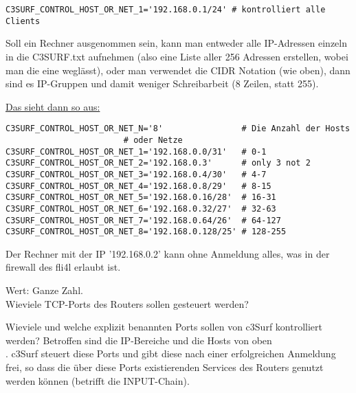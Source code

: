 \begin{itemize}
\begin{description}
\begin{example}
\begin{verbatim}
C3SURF_CONTROL_HOST_OR_NET_1='192.168.0.1/24' # kontrolliert alle Clients
\end{verbatim}
\end{example}

Soll ein Rechner ausgenommen sein, kann man entweder alle IP-Adressen
einzeln in die C3SURF.txt aufnehmen (also eine Liste aller 256 Adressen
erstellen, wobei man die eine weglässt), oder man verwendet die CIDR Notation
(wie oben), dann sind es IP-Gruppen und damit weniger Schreibarbeit
(8 Zeilen, statt 255).

\underline{Das sieht dann so aus:}

\begin{example}
\begin{verbatim}
C3SURF_CONTROL_HOST_OR_NET_N='8'                # Die Anzahl der Hosts
						# oder Netze
C3SURF_CONTROL_HOST_OR_NET_1='192.168.0.0/31'   # 0-1
C3SURF_CONTROL_HOST_OR_NET_2='192.168.0.3'      # only 3 not 2
C3SURF_CONTROL_HOST_OR_NET_3='192.168.0.4/30'   # 4-7
C3SURF_CONTROL_HOST_OR_NET_4='192.168.0.8/29'   # 8-15
C3SURF_CONTROL_HOST_OR_NET_5='192.168.0.16/28'  # 16-31
C3SURF_CONTROL_HOST_OR_NET_6='192.168.0.32/27'  # 32-63
C3SURF_CONTROL_HOST_OR_NET_7='192.168.0.64/26'  # 64-127
C3SURF_CONTROL_HOST_OR_NET_8='192.168.0.128/25' # 128-255
\end{verbatim}
\end{example}

Der Rechner mit der IP '192.168.0.2' kann ohne Anmeldung alles, was
in der firewall des fli4l erlaubt ist.



  Wert: Ganze Zahl.\\
  Wieviele TCP-Ports des Routers sollen gesteuert werden? 

  Wieviele und welche explizit benannten Ports sollen von c3Surf kontrolliert
  werden? Betroffen sind die IP-Bereiche und die Hosts von oben\\
  . c3Surf
  steuert diese Ports und gibt diese nach einer erfolgreichen Anmeldung frei,
  so dass die über diese Ports existierenden Services des Routers genutzt werden können
  (betrifft die INPUT-Chain).



\end{description}
\end{itemize}
